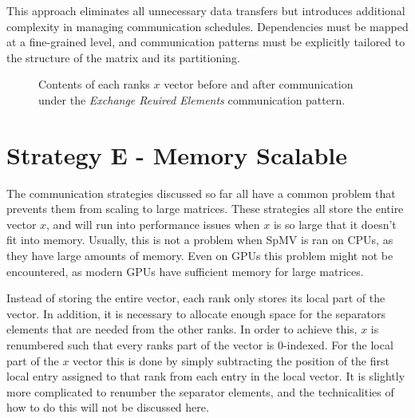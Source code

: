 This approach eliminates all unnecessary data transfers but introduces additional complexity in managing communication schedules. Dependencies must be mapped at a fine-grained level, and communication patterns must be explicitly tailored to the structure of the matrix and its partitioning.



\begin{figure}[ht]
    \centering
    \caption{Contents of each ranks \(x\) vector before and after communication under the \textit{Exchange Reuired Elements} communication pattern.}
    \label{fig:1dcomm}
\end{figure}


\section{Strategy E - Memory Scalable}
The communication strategies discussed so far all have a common problem that prevents them from scaling to large matrices. These strategies all store the entire vector \(x\), and will run into performance issues when \(x\) is so large that it doesn't fit into memory. Usually, this is not a problem when SpMV is ran on CPUs, as they have large amounts of memory. Even on GPUs this problem might not be encountered, as modern GPUs have sufficient memory for large matrices.
\medskip

Instead of storing the entire vector, each rank only stores its local part of the vector. In addition, it is necessary to allocate enough space for the separators elements that are needed from the other ranks. In order to achieve this, \(x\) is renumbered such that every ranks part of the vector is 0-indexed. For the local part of the \(x\) vector this is done by simply subtracting the position of the first local entry assigned to that rank from each entry in the local vector. It is slightly more complicated to renumber the separator elements, and the technicalities of how to do this will not be discussed here.
\medskip

